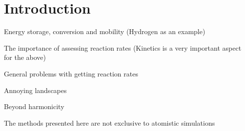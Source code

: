 \chapter{Introduction}
\label{chap:introduction}

\bit
\item Energy storage, conversion and mobility (Hydrogen as an example)
\item The importance of assessing reaction rates (Kinetics is a very important aspect for the above)
\item General problems with getting reaction rates
\item Annoying landscapes
\item Beyond harmonicity
\item The methods presented here are not exclusive to atomistic simulations
\eit

\placeholder


